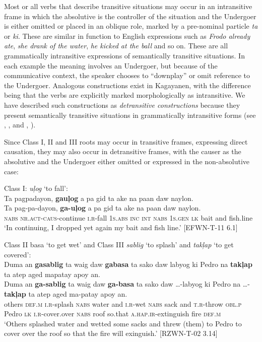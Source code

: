 Most or all verbs that describe transitive situations may occur in an intransitive frame in which the absolutive is the controller of the situation and the Undergoer is either omitted or placed in an oblique role, marked by a pre-nominal particle \textit{ta} or \textit{ki}. These are similar in function to English expressions such as \textit{Frodo already ate}, \textit{she drank of the water}, \textit{he kicked at the ball} and so on. These are all grammatically intransitive expressions of semantically transitive situations. In each example the meaning involves an Undergoer, but because of the communicative context, the speaker chooses to “downplay” or omit reference to the Undergoer. Analogous constructions exist in Kagayanen, with the difference being that the verbs are explicitly marked morphologically as intransitive. We have described such constructions as \textit{detransitive constructions} because they present semantically transitive situations in grammatically intransitive forms (see , , and , ).

Since Class I, II and III roots may occur in transitive frames, expressing direct causation, they may also occur in detransitive frames, with the causer as the absolutive and the Undergoer either omitted or expressed in the non-absolutive case:

\ea
Class I: \textit{uļog} ‘to fall’: \\
Ta  pagpadayon,  \textbf{gauļog}  a  pa  gid  ta  ake  na paan  daw  naylon.\\\smallskip
\gll Ta  pag-pa-dayon,  \textbf{ga-uļog}  a  pa  gid  ta  ake  na paan  daw  naylon.\\
\textsc{nabs}  \textsc{nr.act}-\textsc{caus}-continue  \textsc{i.r}-fall  1\textsc{s.abs}  \textsc{inc}  \textsc{int}  \textsc{nabs} 1\textsc{s.gen}  \textsc{lk}
bait    and  fish.line \\
\glt ‘In continuing, I dropped yet again my bait and fish line.’ [EFWN-T-11 6.1]
\z

\ea
Class II basa ‘to get wet’ and Class III \textit{sablig} ‘to splash’ and \textit{takļap} ‘to  get covered’: \\
Duma  an  \textbf{gasablig}  ta  waig  daw  \textbf{gabasa}  ta  sako daw  labyog  ki  Pedro  na  \textbf{takļap}  ta  atep  aged  mapatay apoy  an.\\\smallskip
\gll Duma  an  \textbf{ga-sablig}  ta  waig  daw  \textbf{ga-basa}  ta  sako daw  …-labyog  ki  Pedro  na  …-\textbf{takļap}  ta  atep  aged  ma-patay apoy  an.\\
others  \textsc{def.m}  \textsc{i.r}-splash  \textsc{nabs} water  and  \textsc{i.r}-wet  \textsc{nabs}  sack and  \textsc{t.r}-throw  \textsc{obl.p}  Pedro  \textsc{lk}  \textsc{i.r}-cover.over  \textsc{nabs}  roof  so.that  \textsc{a.hap.ir}-extinguish fire  \textsc{def.m} \\
\glt ‘Others splashed water and wetted some sacks and threw (them) to Pedro to cover over the roof so that the fire will exinguish.’ [RZWN-T-02 3.14]
\z


